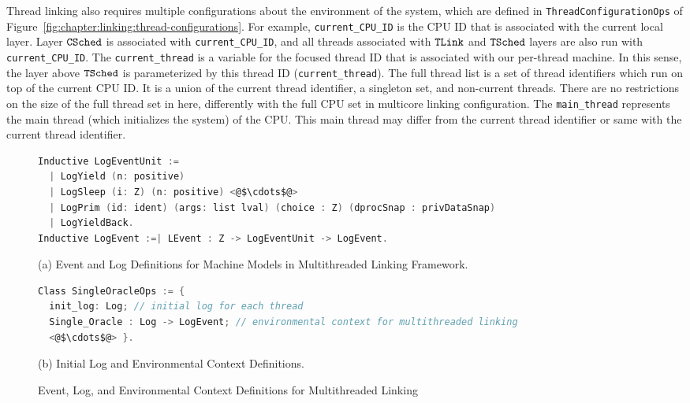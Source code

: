 Thread linking also requires multiple configurations about the environment of the system, which are defined in  
\lstinline$ThreadConfigurationOps$ of Figure~\ref{fig:chapter:linking:thread-configurations}.
For example, \lstinline$current_CPU_ID$ is the CPU ID that is 
associated with the current local layer.
Layer ${{\mathrm{\texttt{CSched}}}}$ is associated with \lstinline$current_CPU_ID$, 
and all threads associated with ${{\mathrm{\texttt{TLink}}}}$ and ${{\mathrm{\texttt{TSched}}}}$ layers 
are also run with  \lstinline$current_CPU_ID$.
The \lstinline$current_thread$ is a variable for the focused thread ID that is associated with our per-thread machine.
In this sense, the layer above ${{\mathrm{\texttt{TSched}}}}$ is parameterized by this thread ID (\lstinline$current_thread$). 
The full thread list is a set of thread identifiers which run on top of the current CPU ID. 
It is a union of the current thread identifier, a singleton set, 
and non-current threads. 
There are no restrictions on the size of the full thread set in here,
differently with the full CPU set in multicore linking configuration.
The \lstinline$main_thread$ represents the main thread (which initializes the system) of the CPU. 
This main thread may differ from the current thread identifier or same with the current thread identifier.


\begin{figure}
\begin{lstlisting}[language=C]
Inductive LogEventUnit :=
  | LogYield (n: positive)
  | LogSleep (i: Z) (n: positive) <@$\cdots$@>
  | LogPrim (id: ident) (args: list lval) (choice : Z) (dprocSnap : privDataSnap) 
  | LogYieldBack.
Inductive LogEvent :=| LEvent : Z -> LogEventUnit -> LogEvent.
\end{lstlisting}
\begin{center}
(a) Event and Log Definitions for Machine Models in Multithreaded Linking Framework.
\end{center}
\begin{lstlisting}[language=C, morekeywords={Class}]
Class SingleOracleOps := {
  init_log: Log; // initial log for each thread
  Single_Oracle : Log -> LogEvent; // environmental context for multithreaded linking
  <@$\cdots$@> }.
\end{lstlisting}
\begin{center}
(b) Initial Log and Environmental Context Definitions.
\end{center}
\caption{Event, Log, and Environmental Context Definitions for Multithreaded Linking}
\label{fig:chapter:linking:event-and-log-for-multithreaded-linking}
\end{figure}


